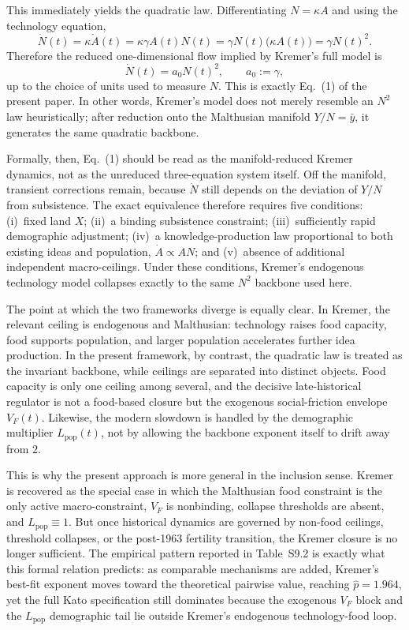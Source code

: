 \documentclass[11pt]{article}
\begin{document}
This immediately yields the quadratic law. Differentiating $N=\kappa A$ and using the technology equation,
\begin{equation}
\dot N(t)=\kappa \dot A(t)=\kappa \gamma A(t)N(t)
=\gamma N(t)\bigl(\kappa A(t)\bigr)=\gamma N(t)^2.
\end{equation}
Therefore the reduced one-dimensional flow implied by Kremer's full model is
\begin{equation}
\dot N(t)=a_0N(t)^2,
\qquad a_0:=\gamma,
\end{equation}
up to the choice of units used to measure $N$. This is exactly Eq.~(1) of the present paper. In other words, Kremer's model does not merely resemble an $N^2$ law heuristically; after reduction onto the Malthusian manifold $Y/N=\bar y$, it generates the same quadratic backbone.

Formally, then, Eq.~(1) should be read as the manifold-reduced Kremer dynamics, not as the unreduced three-equation system itself. Off the manifold, transient corrections remain, because $\dot N$ still depends on the deviation of $Y/N$ from subsistence. The exact equivalence therefore requires five conditions: (i)~fixed land $X$; (ii)~a binding subsistence constraint; (iii)~sufficiently rapid demographic adjustment; (iv)~a knowledge-production law proportional to both existing ideas and population, $\dot A\propto AN$; and (v)~absence of additional independent macro-ceilings. Under these conditions, Kremer's endogenous technology model collapses exactly to the same $N^2$ backbone used here.

The point at which the two frameworks diverge is equally clear. In Kremer, the relevant ceiling is endogenous and Malthusian: technology raises food capacity, food supports population, and larger population accelerates further idea production. In the present framework, by contrast, the quadratic law is treated as the invariant backbone, while ceilings are separated into distinct objects. Food capacity is only one ceiling among several, and the decisive late-historical regulator is not a food-based closure but the exogenous social-friction envelope $V_F(t)$. Likewise, the modern slowdown is handled by the demographic multiplier $L_{\mathrm{pop}}(t)$, not by allowing the backbone exponent itself to drift away from $2$.

This is why the present approach is more general in the inclusion sense. Kremer is recovered as the special case in which the Malthusian food constraint is the only active macro-constraint, $V_F$ is nonbinding, collapse thresholds are absent, and $L_{\mathrm{pop}}\equiv 1$. But once historical dynamics are governed by non-food ceilings, threshold collapses, or the post-1963 fertility transition, the Kremer closure is no longer sufficient. The empirical pattern reported in Table~S9.2 is exactly what this formal relation predicts: as comparable mechanisms are added, Kremer's best-fit exponent moves toward the theoretical pairwise value, reaching $\hat p=1.964$, yet the full Kato specification still dominates because the exogenous $V_F$ block and the $L_{\mathrm{pop}}$ demographic tail lie outside Kremer's endogenous technology-food loop.
\end{document}
